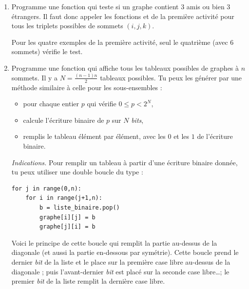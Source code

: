 \documentclass[11pt,class=report,crop=false]{standalone}
\begin{document}

\begin{activite}[Théorème de Ramsey pour $n=6$]


\begin{enumerate}
  \item Programme une fonction  qui teste si un graphe contient $3$ amis ou bien $3$ étrangers. Il faut donc appeler les fonctions  et  de la première activité pour tous les triplets possibles de sommets $(i,j,k)$.
 
 Pour les quatre exemples de la première activité, seul le quatrième (avec $6$ sommets) vérifie le test.
  
  \item Programme une fonction  qui affiche tous les tableaux possibles de graphes à $n$ sommets.
  Il y a $N = \frac{(n-1)n}{2}$ tableaux possibles. Tu peux les générer par une méthode similaire à celle pour les sous-ensembles :
  \begin{itemize}
    \item pour chaque entier $p$ qui vérifie $0 \le p < 2^N$,
    \item calcule l'écriture binaire de $p$ sur $N$ \emph{bits},
    \item remplis le tableau élément par élément, avec les $0$ et les $1$ de l'écriture binaire.
  \end{itemize}


\emph{Indications.}
Pour remplir un tableau à partir d'une écriture binaire  donnée, tu peux utiliser une double boucle du type :

\begin{lstlisting}
for j in range(0,n):
    for i in range(j+1,n):
        b = liste_binaire.pop()
        graphe[i][j] = b
        graphe[j][i] = b
\end{lstlisting}
  
Voici le principe de cette boucle qui remplit la partie au-dessus de la diagonale (et aussi la partie en-dessous par symétrie).
Cette boucle prend le dernier \emph{bit} de la liste et le place sur la première case libre au-dessus de la diagonale ; puis l'avant-dernier \emph{bit} est placé sur la seconde case libre\ldots ; le premier \emph{bit} de la liste remplit la dernière case libre.



\end{enumerate}
\end{activite}
\end{document}

